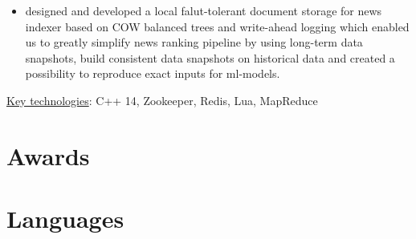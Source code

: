\documentclass[11pt,a4paper,sans]{moderncv}        %
\begin{document}
{\begin{itemize}
        \item designed and developed a local falut-tolerant document storage for news indexer based on COW balanced trees and write-ahead logging which enabled us to greatly simplify news ranking pipeline by using long-term data snapshots, build consistent data snapshots on historical data and created a possibility to reproduce exact inputs for ml-models.
    \end{itemize}
    \underline{Key technologies}: C++ 14, Zookeeper, Redis, Lua, MapReduce%
}

%
%

\section{Awards}

\section{Languages}

\end{document}
